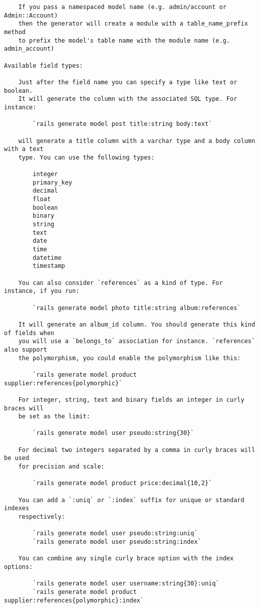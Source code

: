 \documentclass[a4paper]{book}
\newcounter{tab}[chapter]
\begin{document}
\begin{shaded}
\begin{verbatim}
    If you pass a namespaced model name (e.g. admin/account or Admin::Account)
    then the generator will create a module with a table_name_prefix method
    to prefix the model's table name with the module name (e.g. admin_account)

Available field types:

    Just after the field name you can specify a type like text or boolean.
    It will generate the column with the associated SQL type. For instance:

        `rails generate model post title:string body:text`

    will generate a title column with a varchar type and a body column with a text
    type. You can use the following types:

        integer
        primary_key
        decimal
        float
        boolean
        binary
        string
        text
        date
        time
        datetime
        timestamp

    You can also consider `references` as a kind of type. For instance, if you run:

        `rails generate model photo title:string album:references`

    It will generate an album_id column. You should generate this kind of fields when
    you will use a `belongs_to` association for instance. `references` also support
    the polymorphism, you could enable the polymorphism like this:

        `rails generate model product supplier:references{polymorphic}`

    For integer, string, text and binary fields an integer in curly braces will
    be set as the limit:

        `rails generate model user pseudo:string{30}`

    For decimal two integers separated by a comma in curly braces will be used
    for precision and scale:

        `rails generate model product price:decimal{10,2}`

    You can add a `:uniq` or `:index` suffix for unique or standard indexes
    respectively:

        `rails generate model user pseudo:string:uniq`
        `rails generate model user pseudo:string:index`

    You can combine any single curly brace option with the index options:

        `rails generate model user username:string{30}:uniq`
        `rails generate model product supplier:references{polymorphic}:index`



\end{verbatim}
\end{shaded}
\end{document}
